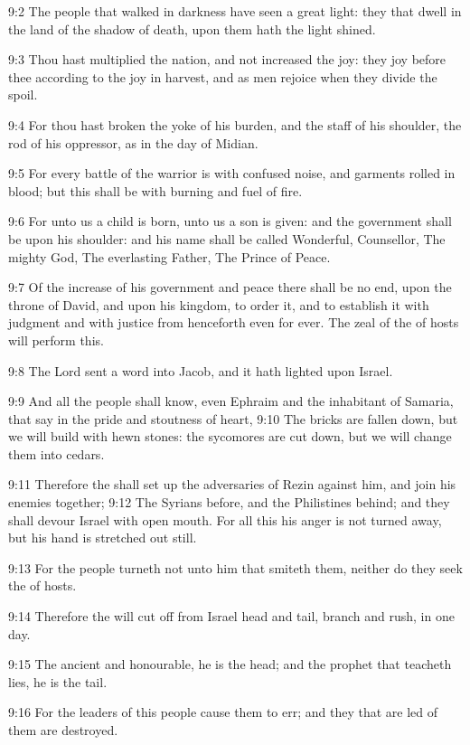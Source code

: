 9:2 The people that walked in darkness have seen a great light: they
that dwell in the land of the shadow of death, upon them hath the
light shined.

9:3 Thou hast multiplied the nation, and not increased the joy: they
joy before thee according to the joy in harvest, and as men rejoice
when they divide the spoil.

9:4 For thou hast broken the yoke of his burden, and the staff of his
shoulder, the rod of his oppressor, as in the day of Midian.

9:5 For every battle of the warrior is with confused noise, and
garments rolled in blood; but this shall be with burning and fuel of
fire.

9:6 For unto us a child is born, unto us a son is given: and the
government shall be upon his shoulder: and his name shall be called
Wonderful, Counsellor, The mighty God, The everlasting Father, The
Prince of Peace.

9:7 Of the increase of his government and peace there shall be no end,
upon the throne of David, and upon his kingdom, to order it, and to
establish it with judgment and with justice from henceforth even for
ever. The zeal of the \LORD of hosts will perform this.

9:8 The Lord sent a word into Jacob, and it hath lighted upon Israel.

9:9 And all the people shall know, even Ephraim and the inhabitant of
Samaria, that say in the pride and stoutness of heart, 9:10 The bricks
are fallen down, but we will build with hewn stones: the sycomores are
cut down, but we will change them into cedars.

9:11 Therefore the \LORD shall set up the adversaries of Rezin against
him, and join his enemies together; 9:12 The Syrians before, and the
Philistines behind; and they shall devour Israel with open mouth. For
all this his anger is not turned away, but his hand is stretched out
still.

9:13 For the people turneth not unto him that smiteth them, neither do
they seek the \LORD of hosts.

9:14 Therefore the \LORD will cut off from Israel head and tail, branch
and rush, in one day.

9:15 The ancient and honourable, he is the head; and the prophet that
teacheth lies, he is the tail.

9:16 For the leaders of this people cause them to err; and they that
are led of them are destroyed.

